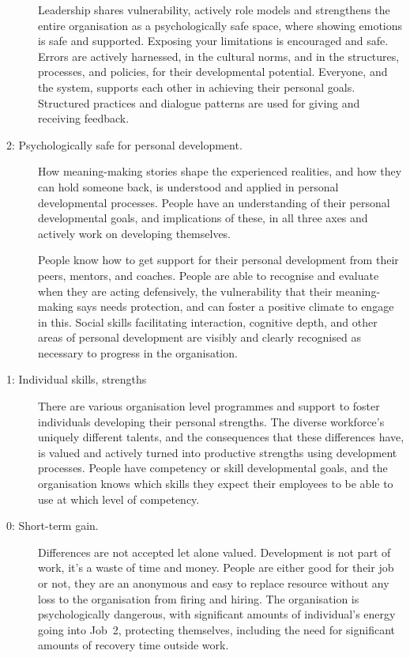 \begin{description}
Leadership shares vulnerability, actively role models and strengthens the entire organisation as a psychologically safe space, where showing emotions is safe and supported. Exposing your limitations is encouraged and safe. Errors are actively harnessed, in the cultural norms, and in the structures, processes, and policies, for their developmental potential. Everyone, and the system, supports each other in achieving their personal goals. Structured practices and dialogue patterns are used for giving and receiving feedback.


\item[2: Psychologically safe for personal development.]  
How meaning\hyp{}making stories shape the experienced realities, and how they can hold someone back, is understood and applied in personal developmental processes. People have an understanding of their personal developmental goals, and implications of these, in all three axes and actively work on developing themselves. 


People know how to get support for their personal development from their peers, mentors, and coaches. People are able to recognise and evaluate when they are acting defensively, the vulnerability that their meaning\hyp{}making says needs protection, and can foster a positive climate to engage in this. Social skills facilitating interaction, cognitive depth, and other areas of personal development are visibly and clearly recognised as necessary to progress in the organisation.


\item[1: Individual skills, strengths]  
There are various organisation level programmes and support to foster individuals developing their personal strengths. The diverse workforce’s uniquely different talents, and the consequences that these differences have, is valued and actively turned into productive strengths using development processes. People have competency or skill developmental goals, and the organisation knows which skills they expect their employees to be able to use at which level of competency.


\item[0: Short-term gain.]  
Differences are not accepted let alone valued. Development is not part of work, it's a waste of time and money. People are either good for their job or not, they are an anonymous and easy to replace resource without any loss to the organisation from firing and hiring. The organisation is psychologically dangerous, with significant amounts of individual's energy going into Job~2, protecting themselves, including the need for significant amounts of recovery time outside work.
\end{description}


